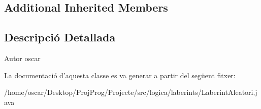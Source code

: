 \subsection*{Additional Inherited Members}


\subsection{Descripció Detallada}
\begin{DoxyAuthor}{Autor}
oscar 
\end{DoxyAuthor}


La documentació d'aquesta classe es va generar a partir del següent fitxer\+:\begin{DoxyCompactItemize}
\item 
/home/oscar/\+Desktop/\+Proj\+Prog/\+Projecte/src/logica/laberints/Laberint\+Aleatori.\+java\end{DoxyCompactItemize}
